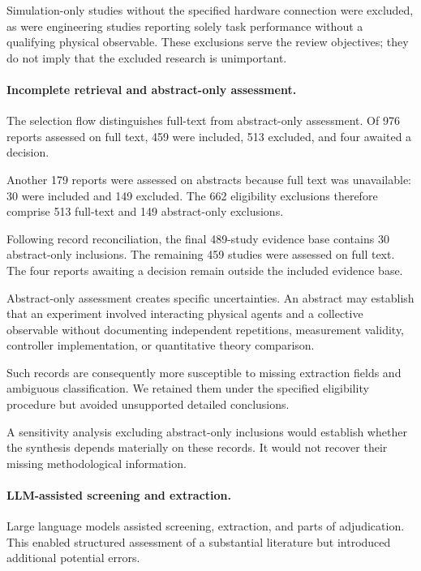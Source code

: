 Simulation-only studies without the specified
hardware connection were excluded, as were
engineering studies reporting solely task
performance without a qualifying physical
observable. These exclusions serve the
review objectives; they do not imply
that the excluded research is unimportant.

\paragraph*{Incomplete retrieval and abstract-only assessment.}

The selection flow distinguishes
full-text from abstract-only assessment.
Of 976 reports assessed on full text,
459 were included,
513 excluded, and four awaited
a decision.

Another 179 reports were assessed
on abstracts because full text
was unavailable: 30 were included
and 149 excluded. The 662
eligibility exclusions therefore
comprise 513 full-text and
149 abstract-only exclusions.

Following record reconciliation,
the final 489-study evidence base
contains 30 abstract-only inclusions.
The remaining 459 studies were
assessed on full text. The four
reports awaiting a decision remain
outside the included evidence base.

Abstract-only assessment creates
specific uncertainties. An abstract
may establish that an experiment
involved interacting physical agents
and a collective observable without
documenting independent repetitions,
measurement validity, controller
implementation, or quantitative
theory comparison.

Such records are consequently more
susceptible to missing extraction
fields and ambiguous classification.
We retained them under the specified
eligibility procedure but avoided
unsupported detailed conclusions.

A sensitivity analysis excluding
abstract-only inclusions would
establish whether the synthesis
depends materially on these records.
It would not recover their
missing methodological information.

\paragraph*{LLM-assisted screening and extraction.}

Large language models assisted screening,
extraction, and parts of adjudication.
This enabled structured assessment
of a substantial literature but
introduced additional potential errors.

